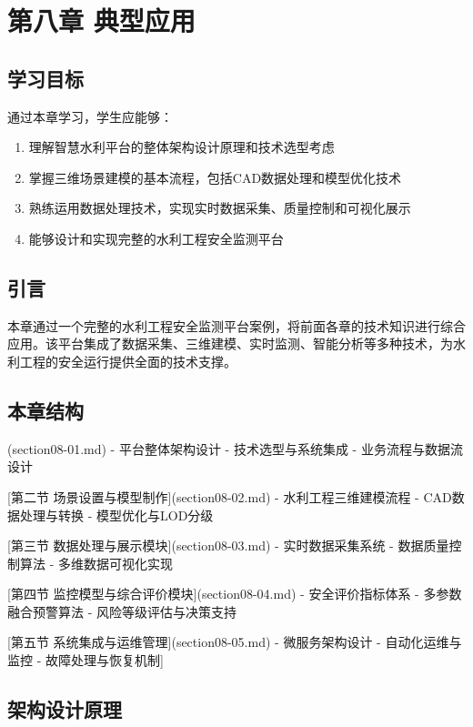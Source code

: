 \chapter{第八章 典型应用}

\section{学习目标}

通过本章学习，学生应能够：

\begin{enumerate}
\def\labelenumi{\arabic{enumi}.}
\tightlist
\item
  理解智慧水利平台的整体架构设计原理和技术选型考虑
\item
  掌握三维场景建模的基本流程，包括CAD数据处理和模型优化技术
\item
  熟练运用数据处理技术，实现实时数据采集、质量控制和可视化展示
\item
  能够设计和实现完整的水利工程安全监测平台
\end{enumerate}

\section{引言}

本章通过一个完整的水利工程安全监测平台案例，将前面各章的技术知识进行综合应用。该平台集成了数据采集、三维建模、实时监测、智能分析等多种技术，为水利工程的安全运行提供全面的技术支撑。

\section{本章结构}

\begin{tcolorbox}[colback=cyan!5!white,colframe=cyan!75!black,title=Info 章节安排
    
     [第一节 水利工程安全监测平台概述](section08-01.md)
    - 平台整体架构设计
    - 技术选型与系统集成
    - 业务流程与数据流设计
    
     [第二节 场景设置与模型制作](section08-02.md)
    - 水利工程三维建模流程
    - CAD数据处理与转换
    - 模型优化与LOD分级
    
     [第三节 数据处理与展示模块](section08-03.md)
    - 实时数据采集系统
    - 数据质量控制算法
    - 多维数据可视化实现
    
     [第四节 监控模型与综合评价模块](section08-04.md)
    - 安全评价指标体系
    - 多参数融合预警算法
    - 风险等级评估与决策支持
    
     [第五节 系统集成与运维管理](section08-05.md)
    - 微服务架构设计
    - 自动化运维与监控
    - 故障处理与恢复机制]
\section{架构设计原理}

\end{tcolorbox}

